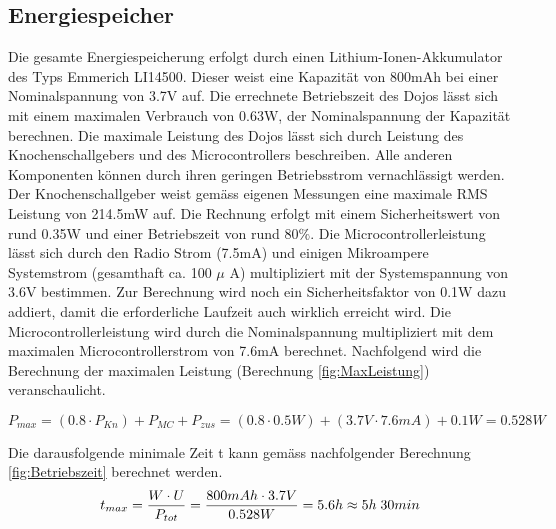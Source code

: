 \subsection{Energiespeicher}

Die gesamte Energiespeicherung erfolgt durch einen Lithium-Ionen-Akkumulator des Typs Emmerich LI14500. Dieser weist eine Kapazität von 800mAh bei einer Nominalspannung von 3.7V auf. Die errechnete Betriebszeit des Dojos lässt sich mit einem maximalen Verbrauch von 0.63W, der Nominalspannung der Kapazität berechnen. Die maximale Leistung des Dojos lässt sich durch Leistung des Knochenschallgebers und des Microcontrollers beschreiben. Alle anderen Komponenten können durch ihren geringen Betriebsstrom vernachlässigt werden. Der Knochenschallgeber weist gemäss eigenen Messungen eine maximale RMS Leistung von 214.5mW auf. Die Rechnung erfolgt mit einem Sicherheitswert von rund 0.35W und einer Betriebszeit von rund 80$\%$. Die Microcontrollerleistung lässt sich durch den Radio Strom (7.5mA) und einigen Mikroampere Systemstrom (gesamthaft ca. 100 $\mu$ A) multipliziert mit der Systemspannung von 3.6V bestimmen. Zur Berechnung wird noch ein Sicherheitsfaktor von 0.1W dazu addiert, damit die erforderliche Laufzeit auch wirklich erreicht wird. Die Microcontrollerleistung wird durch die Nominalspannung multipliziert mit dem maximalen Microcontrollerstrom von 7.6mA berechnet. Nachfolgend wird die Berechnung der maximalen Leistung (Berechnung \ref{fig:MaxLeistung}) veranschaulicht.

\begin{equation}
P_{max}=\left(0.8\cdot P_{Kn}\right)+P_{MC}+P_{zus}=(0.8\cdot 0.5W)+(3.7V \cdot 7.6mA)+0.1W=0.528W
\label{fig:MaxLeistung}
\end{equation}

Die darausfolgende minimale Zeit t kann gemäss nachfolgender Berechnung \ref{fig:Betriebszeit} berechnet werden.
\begin{equation}
t_{max}=\frac{W\cdot U}{P_{tot}}=\frac{800mAh \cdot 3.7V}{0.528W}=5.6h\approx 5h \thickspace 30min
\label{fig:Betriebszeit}
\end{equation}



